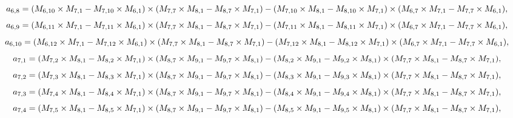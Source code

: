 \documentclass[10pt]{asme2ej}
\begin{document}
\begin{landscape}
\begin{equation}
    a_{6,8} = (M_{6,10}\times M_{7,1}-M_{7,10}\times M_{6,1})\times (M_{7,7}\times M_{8,1}-M_{8,7}\times M_{7,1})\\-(M_{7,10}\times M_{8,1}-M_{8,10}\times M_{7,1})\times (M_{6,7}\times M_{7,1}-M_{7,7}\times M_{6,1}),
\end{equation}
\begin{equation}
    a_{6,9} = (M_{6,11}\times M_{7,1}-M_{7,11}\times M_{6,1})\times (M_{7,7}\times M_{8,1}-M_{8,7}\times M_{7,1})\\-(M_{7,11}\times M_{8,1}-M_{8,11}\times M_{7,1})\times (M_{6,7}\times M_{7,1}-M_{7,7}\times M_{6,1}),
\end{equation}
\begin{equation}
    a_{6,10} = (M_{6,12}\times M_{7,1}-M_{7,12}\times M_{6,1})\times (M_{7,7}\times M_{8,1}-M_{8,7}\times M_{7,1})\\-(M_{7,12}\times M_{8,1}-M_{8,12}\times M_{7,1})\times (M_{6,7}\times M_{7,1}-M_{7,7}\times M_{6,1}),
\end{equation}
\begin{equation}
    a_{7,1} = (M_{7,2}\times M_{8,1}-M_{8,2}\times M_{7,1})\times (M_{8,7}\times M_{9,1}-M_{9,7}\times M_{8,1})\\-(M_{8,2}\times M_{9,1}-M_{9,2}\times M_{8,1})\times (M_{7,7}\times M_{8,1}-M_{8,7}\times M_{7,1}),
\end{equation}
\begin{equation}
    a_{7,2} = (M_{7,3}\times M_{8,1}-M_{8,3}\times M_{7,1})\times (M_{8,7}\times M_{9,1}-M_{9,7}\times M_{8,1})\\-(M_{8,3}\times M_{9,1}-M_{9,3}\times M_{8,1})\times (M_{7,7}\times M_{8,1}-M_{8,7}\times M_{7,1}),
\end{equation}
\begin{equation}
    a_{7,3} = (M_{7,4}\times M_{8,1}-M_{8,4}\times M_{7,1})\times (M_{8,7}\times M_{9,1}-M_{9,7}\times M_{8,1})\\-(M_{8,4}\times M_{9,1}-M_{9,4}\times M_{8,1})\times (M_{7,7}\times M_{8,1}-M_{8,7}\times M_{7,1}),
\end{equation}
\begin{equation}
    a_{7,4} = (M_{7,5}\times M_{8,1}-M_{8,5}\times M_{7,1})\times (M_{8,7}\times M_{9,1}-M_{9,7}\times M_{8,1})\\-(M_{8,5}\times M_{9,1}-M_{9,5}\times M_{8,1})\times (M_{7,7}\times M_{8,1}-M_{8,7}\times M_{7,1}),
\end{equation}
\begin{equation}

\end{equation}
\end{landscape}
\end{document}
